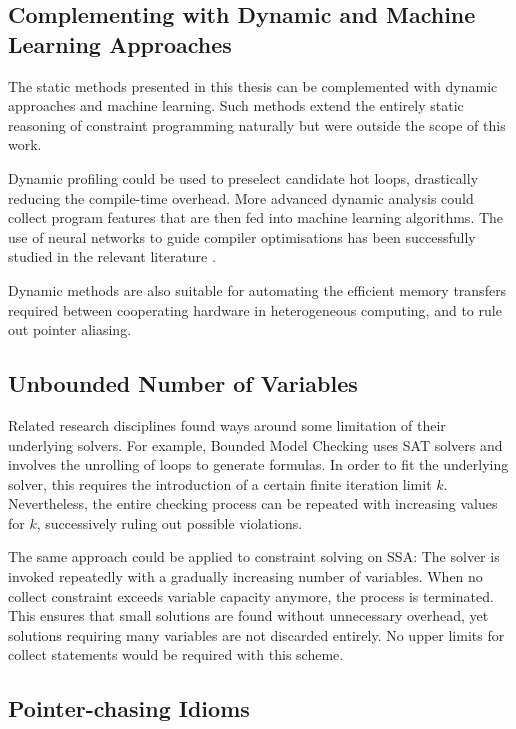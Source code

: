 \subsection*{Complementing with Dynamic and Machine Learning Approaches}

    The static methods presented in this thesis can be complemented with dynamic
    approaches and machine learning.
    Such methods extend the entirely static reasoning of constraint programming
    naturally but were outside the scope of this work.

    Dynamic profiling could be used to preselect candidate hot loops,
    drastically reducing the compile-time overhead.
    More advanced dynamic analysis could collect program features that are
    then fed into machine learning algorithms.
    The use of neural networks to guide compiler optimisations has been
    successfully studied in the relevant literature
    \citep{DBLP:journals/pieee/WangO18}.

    Dynamic methods are also suitable for automating the efficient memory
    transfers required between cooperating hardware in heterogeneous
    computing, and to rule out pointer aliasing.

\subsection*{Unbounded Number of Variables}

    Related research disciplines found ways around some limitation of their
    underlying solvers.
    For example, Bounded Model Checking \cite{Clarke:2001:BMC:510986.510987}
    uses SAT solvers and involves the unrolling of loops to generate formulas.
    In order to fit the underlying solver, this requires the introduction of a
    certain finite iteration limit $k$.
    Nevertheless, the entire checking process can be repeated with increasing
    values for $k$, successively ruling out possible violations.

    The same approach could be applied to constraint solving on SSA:
    The solver is invoked repeatedly with a gradually increasing number of
    variables.
    When no collect constraint exceeds variable capacity anymore, the
    process is terminated.
    This ensures that small solutions are found without unnecessary
    overhead, yet solutions requiring many variables are not discarded entirely.
    No upper limits for collect statements would be required with this scheme.

\subsection*{Pointer-chasing Idioms}

